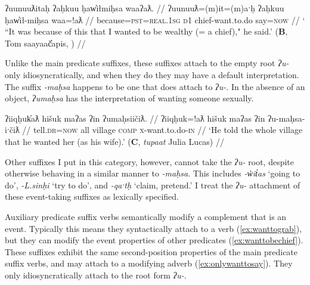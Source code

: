 \begin{comment}
EMB points out that below "want to" is attaching to causative

\ex \label{ex:wanttomakestrong}
\begingl
\glpreamble ʔunʔuuƛḥwaʔišʔaał ʔin ḥaaʔakmaḥsapsuuk m̓aam̓iiqsu. //
\gla ʔunʔuuƛ-(q)ḥ=waˑʔiš=ʔaał ʔin ḥaaʔak-maḥsa=!ap=suuk m̓aam̓iiqsu //
\glb because-\textsc{link}=\textsc{hrsy.3}=\textsc{habit} \textsc{comp} strong-want.to.do=\textsc{caus}=\textsc{neut.2pl} older.sibling //
\glft `It's because you want to make your older sibling strong.' (\textbf{C}, \textit{tupaat} Julia Lucas) //
\endgl
\xe
\end{comment}

\ex \label{ex:wanttobechief}
\begingl
\glpreamble ʔuunuuƛitaḥ ʔaḥkuu ḥaw̓iłmiḥsa waaʔaƛ. //
\gla ʔuunuuƛ=(m)it=(m)aˑḥ ʔaḥkuu ḥaw̓ił-miḥsa waa=!aƛ //
\glb because=\textsc{pst}=\textsc{real.1sg} \textsc{d1} chief-want.to.do say=\textsc{now} //
\glft ` ``It was because of this that I wanted to be wealthy (= a chief)," he said.' (\textbf{B}, Tom saayaač̓apis, \citealt[p.~25]{sapir1955}) //
\endgl
\xe

Unlike the main predicate suffixes, these suffixes attach to the empty root \textit{ʔu-} only idiosyncratically, and when they do they may have a default interpretation. The suffix \textit{-maḥsa} happens to be one that does attach to \textit{ʔu-}. In the absence of an object, \textit{ʔumaḥsa} has the interpretation of wanting someone sexually.

\ex \label{ex:wanttomarry}
\begingl
\glpreamble ʔiiqḥuk̓aƛ hišuk maʔas ʔin ʔumaḥsiičiƛ. //
\gla ʔiiqḥuk=!aƛ hišuk maʔas ʔin ʔu-maḥsa-iˑčiƛ //
\glb tell.\textsc{dr}=\textsc{now} all village \textsc{comp} \textsc{x}-want.to.do-\textsc{in} //
\glft `He told the whole village that he wanted her (as his wife).' (\textbf{C}, \textit{tupaat} Julia Lucas) //
\endgl
\xe

Other suffixes I put in this category, however, cannot take the \textit{ʔu-} root, despite otherwise behaving in a similar manner to \textit{-maḥsa}. This includes \textit{-w̓it̓as} `going to do', \textit{-L.sinḥi} `try to do', and \textit{-qaˑtḥ} `claim, pretend.' I treat the \textit{ʔu-} attachment of these event-taking suffixes as lexically specified.

Auxiliary predicate suffix verbs semantically modify a complement that is an event. Typically this means they syntactically attach to a verb (\ref{ex:wanttograb}), but they can modify the event properties of other predicates (\ref{ex:wanttobechief}). These suffixes exhibit the same second-position properties of the main predicate suffix verbs, and may attach to a modifying adverb (\ref{ex:onlywanttosay}). They only idiosyncratically attach to the root form \textit{ʔu-}.

